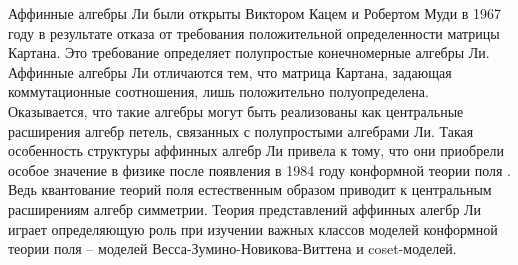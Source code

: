 \intro

%
%



Аффинные алгебры Ли были открыты Виктором Кацем \cite{kac1968simple} и Робертом Муди \cite{moody1968new} в 1967 году в результате отказа от требования положительной определенности матрицы Картана. Это требование определяет полупростые конечномерные алгебры Ли. Аффинные алгебры Ли отличаются тем, что матрица Картана, задающая коммутационные соотношения, лишь положительно полуопределена. Оказывается, что такие алгебры могут быть реализованы как центральные расширения алгебр петель, связанных с полупростыми алгебрами Ли. Такая особенность структуры аффинных алгебр Ли привела к тому, что они приобрели особое значение в физике после появления в 1984 году конформной теории поля \cite{belavin1984ics}. Ведь квантование теорий поля естественным образом приводит к центральным расширениям алгебр симметрии. Теория представлений аффинных алегбр Ли играет определяющую роль при изучении важных классов моделей конформной теории поля -- моделей Весса-Зумино-Новикова-Виттена и coset-моделей. 









\resultssection
\resultstext

\approbationsection
\approbationtext

\pubsection
\pubtext

\contribsection
\contribtext

\structsection
\structtext
